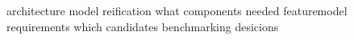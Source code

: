 architecture
	model reification
what components needed
	featuremodel
	requirements
which candidates
benchmarking
desicions
